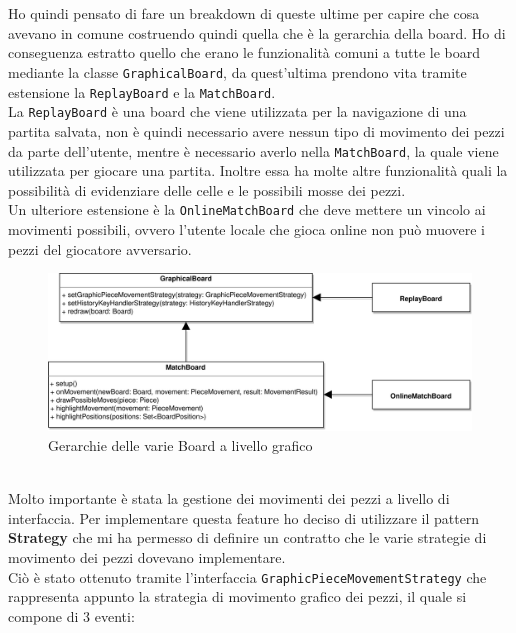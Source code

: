 \documentclass[a4paper,12pt]{report}
\begin{document}
\paragraph{}
\
\\
Ho quindi pensato di fare un breakdown di queste ultime per capire che cosa avevano in comune costruendo quindi quella che è la gerarchia della board.
Ho di conseguenza estratto quello che erano le funzionalità comuni a tutte le board mediante la classe \texttt{GraphicalBoard}, da quest'ultima prendono vita tramite estensione la \texttt{ReplayBoard} e la \texttt{MatchBoard}.
\\
La \texttt{ReplayBoard} è una board che viene utilizzata per la navigazione di una partita salvata, non è quindi necessario avere nessun tipo di movimento dei pezzi da parte dell'utente, mentre è necessario averlo nella \texttt{MatchBoard}, la quale viene utilizzata per giocare una partita. Inoltre essa ha molte altre funzionalità quali la possibilità di evidenziare delle celle e le possibili mosse dei pezzi.
\\
Un ulteriore estensione è la \texttt{OnlineMatchBoard} che deve mettere un vincolo ai movimenti possibili, ovvero l'utente locale che gioca online non può muovere i pezzi del giocatore avversario.
%
\begin{figure}[H]
    \begin{center}
        \centering
        \includegraphics[width=\textwidth]{img/Alessandro/graphic_board.png}
    \end{center}
    \caption{Gerarchie delle varie Board a livello grafico}
    \label{img:graphic_board}
\end{figure}
\
\\
Molto importante è stata la gestione dei movimenti dei pezzi a livello di interfaccia.
Per implementare questa feature ho deciso di utilizzare il pattern \textbf{Strategy} che mi ha permesso di definire un contratto che le varie strategie di movimento dei pezzi dovevano implementare.
\\
Ciò è stato ottenuto tramite l'interfaccia \texttt{GraphicPieceMovementStrategy} che rappresenta appunto la strategia di movimento grafico dei pezzi, il quale si compone di 3 eventi:
\end{document}
